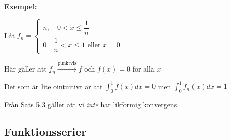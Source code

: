 \par\bigskip
\noindent\textbf{Exempel:}\par
\noindent Låt $f_n = \begin{cases}n,\quad 0< x\leq \dfrac{1}{n}\\0\quad \dfrac{1}{n}<x\leq 1\text{ eller } x= 0\end{cases}$
\par\bigskip
\noindent Här gäller att $f_n\stackrel{\text{punktvis}}{\to}f$ och $f(x) = 0$ för alla $x$\par
\noindent Det som är lite ointuitivt är att $\int_{0}^{1}f(x)dx = 0$ men $\int_{0}^{1}f_n(x)dx=1$
\par\bigskip
\noindent Från Sats 5.3 gäller att vi \textit{inte} har likformig konvergens.
\newpage
\subsection{Funktionsserier}\hfill\\\par
